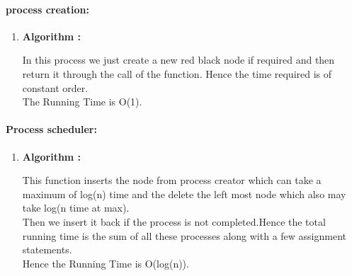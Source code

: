 \documentclass[a4paper,11pt]{article}
\begin{document}
\paragraph{process creation:}


\begin{enumerate}
\item \textbf{Algorithm :}


In this process we just create a new red black node if required and then return it through the call of the function.
Hence the time required is of constant order.\\
The Running Time is O(1).\\
\end{enumerate}
\paragraph{Process scheduler:}


\begin{enumerate}
\item \textbf{Algorithm :}


This function inserts the node from process creator which can take a maximum of  log(n) time and the delete the left most node which also may take log(n time at max).\\
Then we insert it back if the process is not completed.Hence the total running time is the sum of all these processes along with a few assignment statements.\\
Hence the Running Time is O(log(n)).\\

\end{enumerate}
\end{document}
